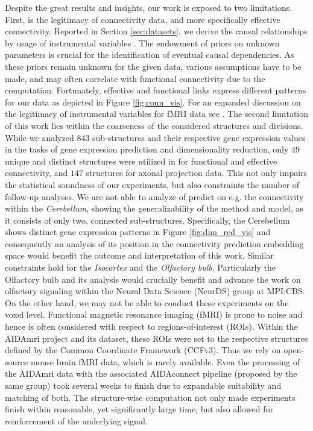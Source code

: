 \documentclass[]{article}
\renewcommand{\cite}{\citep}
\begin{document}
Despite the great results and insights, our work is exposed to two limitations. First, is the legitimacy of connectivity data, and more specifically effective connectivity. Reported in Section \ref{sec:datasets}, we derive the causal relationships by usage of instrumental variables \cite{angrist2009mostly, pearl2009causality, baiocchi2014instrumental}. The endowment of priors on unknown parameters is crucial for the identification of eventual causal dependencies. As these priors remain unknown for the given data, various assumptions have to be made, and may often correlate with functional connectivity due to the computation. Fortunately, effective and functional links express different patterns for our data as depicted in Figure \ref{fig:conn_vis}. For an expanded discussion on the legitimacy of instrumental variables for fMRI data see \citet{valdes2011effective}.
The second limitation of this work lies within the coarseness of the considered structures and divisions. While we analyzed $843$ sub-structures and their respective gene expression values in the tasks of gene expression prediction and dimensionality reduction, only $49$ unique and distinct structures were utilized in \citet{AIDAmri2019} for functional and effective connectivity, and $147$ structures for axonal projection data. This not only impairs the statistical soundness of our experiments, but also constraints the number of follow-up analyses. We are not able to analyze of predict on e.g. the connectivity within the \textit{Cerebellum}, showing the generalizability of the method and model, as it consists of only two, connected sub-structures. Specifically, the Cerebellum shows distinct gene expression patterns in Figure \ref{fig:dim_red_vis} and consequently an analysis of its position in the connectivity prediction embedding space would benefit the outcome and interpretation of this work. Similar constraints hold for the \textit{Isocortex} and the \textit{Olfactory bulb}. Particularly the Olfactory bulb and its analysis would crucially benefit and advance the work on olfactory signaling within the Neural Data Science (NeurDS) group at MPI:CBS.
On the other hand, we may not be able to conduct these experiments on the voxel level. Functional magnetic resonance imaging (fMRI) is prone to noise and hence is often considered with respect to regions-of-interest (ROIs). Within the AIDAmri project \cite{AIDAmri2019} and its dataset, these ROIs were set to the respective structures defined by the Common Coordinate Framework (CCFv3). Thus we rely on open-source mouse brain fMRI data, which is rarely available. Even the processing of the AIDAmri data with the associated AIDAconnect  pipeline (proposed by the same group) took several weeks to finish due to expandable suitability and matching of both. The structure-wise computation not only made experiments finish within reasonable, yet significantly large time, but also allowed for reinforcement of the underlying signal.
\end{document}
